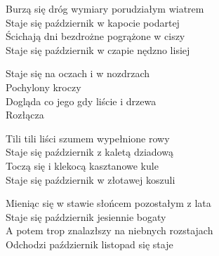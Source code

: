 \begin{text}
    Burzą się dróg wymiary porudziałym wiatrem\\
    Staje się październik w kapocie podartej\\
    Ścichają dni bezdrożne pogrążone w ciszy\\
    Staje się październik w czapie nędzno lisiej

    \vin Staje się na oczach i w nozdrzach\\
    \vin Pochylony kroczy\\
    \vin Dogląda co jego gdy liście i drzewa\\
    \vin Rozłącza

    Tili tili liści szumem wypełnione rowy\\
    Staje się październik z kaletą dziadową\\
    Toczą się i klekocą kasztanowe kule\\
    Staje się październik w złotawej koszuli

    Mieniąc się w stawie słońcem pozostałym z lata\\
    Staje się październik jesiennie bogaty\\
    A potem trop znalazłszy na niebnych rozstajach\\
    Odchodzi październik listopad się staje
\end{text}
\begin{chord}

\end{chord}